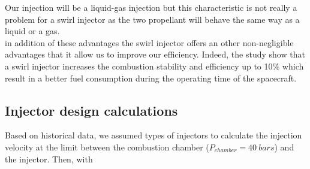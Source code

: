 Our injection will be a liquid-gas injection but this characteristic is not really a problem for a swirl injector as the two propellant will behave the same way as a liquid or a gas.\\

in addition of these advantages the swirl injector offers an other non-negligible advantages that it allow us to improve our efficiency. Indeed, the study show that a swirl injector increases the combustion stability and efficiency up to 10$\%$ which result in a better fuel consumption during the operating time of the spacecraft. 
\pagebreak
\subsection{Injector design calculations}
Based on historical data, we assumed types of injectors to calculate the injection velocity at the limit between the combustion chamber ($P_{chamber} = 40\ bars$) and the injector. Then, with 

